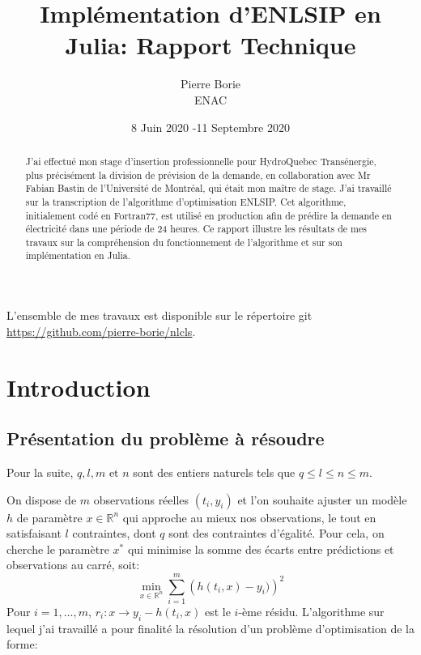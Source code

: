 \documentclass[a4paper,11pt]{article}
\numberwithin{equation}{section}
\begin{document}
\title{Implémentation d'ENLSIP en Julia: Rapport Technique}
\author{Pierre Borie \\ ENAC}

\date{8 Juin 2020 -11 Septembre 2020}
\maketitle



	
\begin{abstract}
J'ai effectué mon stage d'insertion professionnelle pour HydroQuebec Transénergie, plus précisément la division de prévision de la demande, en collaboration avec Mr Fabian Bastin de l'Université de Montréal, qui était mon maître de stage. J'ai travaillé sur la transcription de l'algorithme d'optimisation ENLSIP. Cet algorithme, initialement codé en Fortran77, est utilisé en production afin de prédire la demande en électricité dans une période de 24 heures. Ce rapport illustre les résultats de mes travaux sur la compréhension du fonctionnement de l'algorithme et sur son implémentation en Julia. 
\end{abstract}

L'ensemble de mes travaux est disponible sur le répertoire git \url{https://github.com/pierre-borie/nlcls}.

\tableofcontents

\section{Introduction} \label{intro}
\subsection{Présentation du problème à résoudre} \label{presentation}


Pour la suite, $q,l,m\text{ et }n$ sont des entiers naturels tels que $q \leq l \leq n \leq m$. 

On dispose de $m$ observations réelles  $(t_{i},y_{i})$ et l'on souhaite ajuster un modèle $h$ de paramètre $x\in \mathbb{R}^{n}$ qui approche au mieux nos observations, le tout en satisfaisant $l$ contraintes, dont $q$ sont des contraintes d'égalité. Pour cela, on cherche le paramètre $x^{*}$ qui minimise la somme des écarts entre prédictions et observations au carré, soit:
\[
\underset{x \in \mathbb{R}^{n}}{\min} \sum_{i=1}^{m} \left(h(t_{i},x)-y_{i})\right)^{2}
\]
Pour $i=1,\ldots,m$, $r_{i}: x \to y_{i} - h(t_{i},x)$ est le $i$-ème résidu.
L'algorithme sur lequel j'ai travaillé a pour finalité la résolution d'un problème d'optimisation de la forme: 
\end{document}
